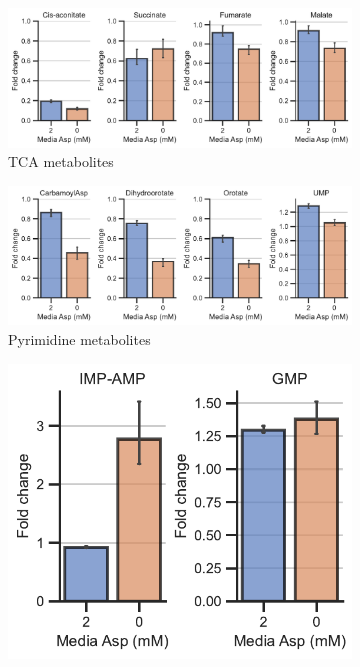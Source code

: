 \begin{figure}[!ht]
\begin{subfigure}[b]{0.6\textwidth}
         \includegraphics[width=\textwidth]{figures/sapp/GOT_DKO_Asp_depl/143B_DKO_tca.pdf}
         \caption{TCA metabolites}
         \label{fig:sapp:GOT_DKO_Asp_depl:143B_DKO_tca}
     \end{subfigure}
     \hfill
     \begin{subfigure}[b]{0.6\textwidth}
         \includegraphics[width=\textwidth]{figures/sapp/GOT_DKO_Asp_depl/143B_DKO_pyr.pdf}
         \caption{Pyrimidine metabolites}
         \label{fig:sapp:GOT_DKO_Asp_depl:143B_DKO_pyr}
     \end{subfigure}
     \hfill
     \begin{subfigure}[b]{0.3\textwidth}
         \includegraphics[width=\textwidth]{figures/sapp/GOT_DKO_Asp_depl/143B_DKO_pur.pdf}

\end{subfigure}
\end{figure}
